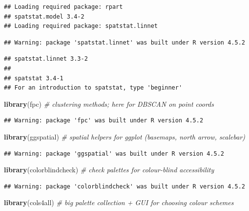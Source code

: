 \documentclass[
]{article}
\newenvironment{Shaded}{\begin{snugshade}}{\end{snugshade}}
\newcommand{\CommentTok}[1]{\textcolor[rgb]{0.56,0.35,0.01}{\textit{#1}}}
\newcommand{\FunctionTok}[1]{\textcolor[rgb]{0.13,0.29,0.53}{\textbf{#1}}}
\newcommand{\NormalTok}[1]{#1}
\begin{document}
\begin{verbatim}
## Loading required package: rpart
## spatstat.model 3.4-2
## Loading required package: spatstat.linnet
\end{verbatim}

\begin{verbatim}
## Warning: package 'spatstat.linnet' was built under R version 4.5.2
\end{verbatim}

\begin{verbatim}
## spatstat.linnet 3.3-2
## 
## spatstat 3.4-1 
## For an introduction to spatstat, type 'beginner'
\end{verbatim}

\begin{Shaded}
\begin{Highlighting}[]
\FunctionTok{library}\NormalTok{(fpc)             }\CommentTok{\# clustering methods; here for DBSCAN on point coords}
\end{Highlighting}
\end{Shaded}

\begin{verbatim}
## Warning: package 'fpc' was built under R version 4.5.2
\end{verbatim}

\begin{Shaded}
\begin{Highlighting}[]
\FunctionTok{library}\NormalTok{(ggspatial)       }\CommentTok{\# spatial helpers for ggplot (basemaps, north arrow, scalebar)}
\end{Highlighting}
\end{Shaded}

\begin{verbatim}
## Warning: package 'ggspatial' was built under R version 4.5.2
\end{verbatim}

\begin{Shaded}
\begin{Highlighting}[]
\FunctionTok{library}\NormalTok{(colorblindcheck) }\CommentTok{\# check palettes for colour{-}blind accessibility}
\end{Highlighting}
\end{Shaded}

\begin{verbatim}
## Warning: package 'colorblindcheck' was built under R version 4.5.2
\end{verbatim}

\begin{Shaded}
\begin{Highlighting}[]
\FunctionTok{library}\NormalTok{(cols4all)        }\CommentTok{\# big palette collection + GUI for choosing colour schemes}
\end{Highlighting}
\end{Shaded}
\end{document}
